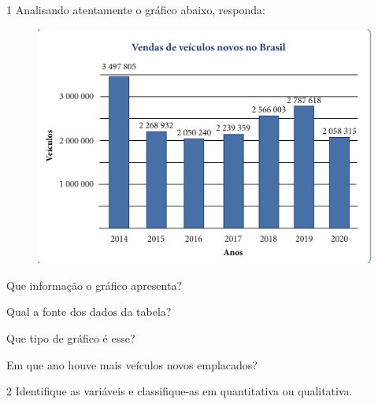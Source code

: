 \num{1} Analisando atentamente o gráfico abaixo, responda:

\begin{figure}[htpb!]
\includegraphics[width=\textwidth]{../ilustracoes/MAT5/SAEB_5ANO_MAT_figura96.png}
\end{figure}

\begin{escolha}
\item
  Que informação o gráfico apresenta?\\

\item
  Qual a fonte dos dados da tabela?\\

\item
  Que tipo de gráfico é esse?\\

\item
  Em que ano houve mais veículos novos emplacados?\\
\end{escolha}

\num{2} Identifique as variáveis e classifique-as em quantitativa 
ou qualitativa.

